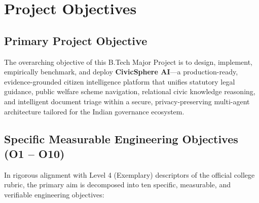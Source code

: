 \chapter{Project Objectives}
\label{ch:project_objectives}

\section{Primary Project Objective}
\label{sec:primary_objective}
The overarching objective of this B.Tech Major Project is to design, implement, empirically benchmark, and deploy \textbf{CivicSphere AI}---a production-ready, evidence-grounded citizen intelligence platform that unifies statutory legal guidance, public welfare scheme navigation, relational civic knowledge reasoning, and intelligent document triage within a secure, privacy-preserving multi-agent architecture tailored for the Indian governance ecosystem.

\section{Specific Measurable Engineering Objectives (O1 -- O10)}
\label{sec:specific_objectives}
In rigorous alignment with Level 4 (Exemplary) descriptors of the official college rubric, the primary aim is decomposed into ten specific, measurable, and verifiable engineering objectives:

